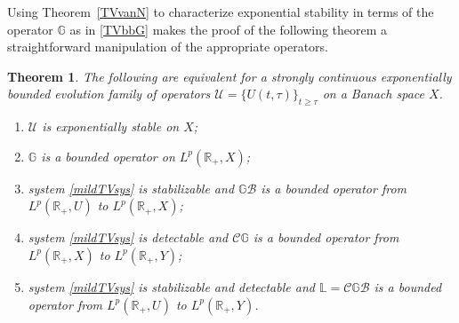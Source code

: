 \documentclass[10pt,psamsfonts,leqno]{siamltex}
\newtheorem{thm}[prop]{Theorem}
\newcommand{\bbR}{\mathbb{R}}
\newcommand{\bbL}{\mathbb{L}}
\newcommand{\bbG}{\mathbb{G}}
\newcommand{\calB}{\mathcal{B}}
\newcommand{\calC}{\mathcal{C}}
\newcommand{\lb}{\label}
\newcommand{\LpRp}{{L^p(\bbR_+,X)}}
\newcommand{\LpRU}{{L^p(\bbR_+,U)}}
\newcommand{\LpRY}{{L^p(\bbR_+,Y)}}
\newcommand{\U}{\mathcal{U}}
\begin{document}
Using  Theorem~\ref{TVvanN}  to characterize exponential stability in
terms of the operator $\bbG$ as in \eqref{TVbbG} makes the proof of the
following theorem a straightforward manipulation of the appropriate
operators.

\begin{thm}\lb{bigIOstab}
The following are equivalent for a strongly continuous exponentially
bounded evolution family of operators $\U=\{U(t,\tau)\}_{t\ge \tau}$ on
a
Banach space $X$.

\begin{enumerate}
\item $\U$ is exponentially stable on $X$;
\item $\bbG$ is a bounded operator on $\LpRp$;
\item system \eqref{mildTVsys} is stabilizable and $\bbG\calB$ is a
bounded
operator from $\LpRU$ to $\LpRp$;
\item system \eqref{mildTVsys} is detectable and $\calC\bbG$ is a
bounded
operator from $\LpRp$ to $\LpRY$;
\item system \eqref{mildTVsys} is stabilizable and detectable and
$\bbL=\calC\bbG\calB$ is a bounded operator from $\LpRU$ to $\LpRY$.
\end{enumerate}
\end{thm}
\end{document}
